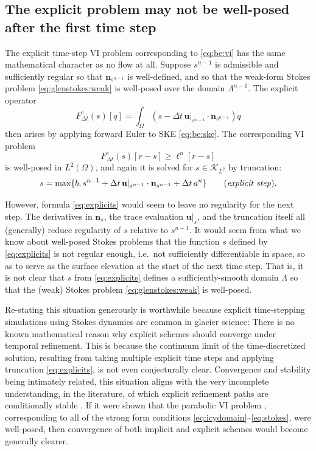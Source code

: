 \documentclass[hidelinks,onefignum,onetabnum,final]{siamart220329}  %
\newcommand{\bn}{\mathbf{n}}
\newcommand{\bu}{\mathbf{u}}
\newcommand{\cK}{\mathcal{K}}
\begin{document}
\subsection{The explicit problem may not be well-posed after the first time step} \label{subsec:explicit}   The explicit time-step VI problem corresponding to \eqref{eq:be:vi} has the same mathematical character as no flow at all.  Suppose $s^{n-1}$ is admissible and sufficiently regular so that $\bn_{s^{n-1}}$ is well-defined, and so that the weak-form Stokes problem \eqref{eq:glenstokes:weak} is well-posed over the domain $\Lambda^{n-1}$.  The explicit operator
\begin{equation}
F^{\text{e}}_{\Delta t}(s)[q] = \int_\Omega \left(s - \Delta t\, \bu|_{s^{n-1}} \cdot \bn_{s^{n-1}}\right) q  \label{eq:explicitFdefine}
\end{equation}
then arises by applying forward Euler to SKE \eqref{eq:be:ske}.  The corresponding VI problem
\begin{equation}
F^{\text{e}}_{\Delta t}(s)[r-s] \ge \ell^n[r-s]
\end{equation}
is well-posed in $L^2(\Omega)$, and again it is solved for $s \in \cK_{L^2}$ by truncation:
\begin{equation}
s = \max\{b, s^{n-1} + \Delta t\, \bu|_{s^{n-1}} \cdot \bn_{s^{n-1}} + \Delta t\,a^n\} \qquad (\text{\emph{explicit step}}). \label{eq:explicits}
\end{equation}

However, formula \eqref{eq:explicits} would seem to leave no regularity for the next step.  The derivatives in $\bn_{s}$, the trace evaluation $\bu|_{s}$, and the truncation itself all (generally) reduce regularity of $s$ relative to $s^{n-1}$.  It would seem from what we know about well-posed Stokes problems that the function $s$ defined by \eqref{eq:explicits} is not regular enough, i.e.~not sufficiently differentiable in space, so as to serve as the surface elevation at the start of the next time step.  That is, it is not clear that $s$ from \eqref{eq:explicits} defines a sufficiently-smooth domain $\Lambda$ so that the (weak) Stokes problem \eqref{eq:glenstokes:weak} is well-posed.

Re-stating this situation generously is worthwhile because explicit time-stepping simulations using Stokes dynamics are common in glacier science:  There is no known mathematical reason why explicit schemes should converge under temporal refinement.  This is because the continuum limit of the time-discretized solution, resulting from taking multiple explicit time steps and applying truncation \eqref{eq:explicits}, is not even conjecturally clear.  Convergence and stability being intimately related, this situation aligns with the very incomplete understanding, in the literature, of which explicit refinement paths are conditionally stable \cite[and references therein]{Bueler2023,Chengetal2017,LofgrenAhlkronaHelanow2022}.  If it were shown that the parabolic  VI problem \cite{Glowinski1984}, corresponding to all of the strong form conditions \eqref{eq:icydomain}--\eqref{eq:stokes}, were well-posed, then convergence of both implicit and explicit schemes would become generally clearer.
\end{document}
